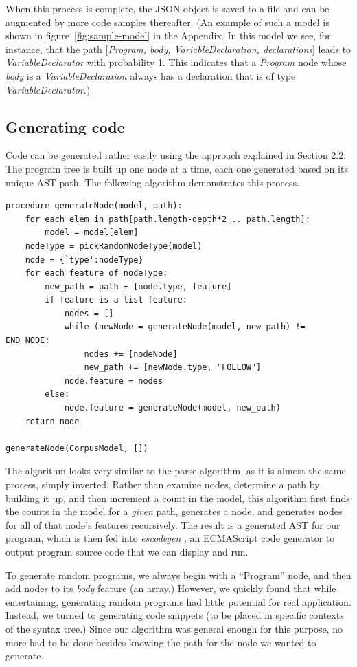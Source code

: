 \documentclass{article}
\begin{document}
When this process is complete, the JSON object is saved to a file and can be augmented by more code samples thereafter. (An example of such a model is shown in figure~\ref{fig:sample-model} in the Appendix. In this model we see, for instance, that the path
[\emph{Program, body, VariableDeclaration, declarations}] leads to
\emph{VariableDeclarator} with probability 1. This indicates that a \emph{Program}
node whose \emph{body} is a \emph{VariableDeclaration} always has a declaration that is of
type \emph{VariableDeclarator}.)

\subsection{Generating code}

Code can be generated rather easily using the approach explained in Section 2.2. The program tree is built up one node at a time, each one generated based on its unique AST path. The following algorithm demonstrates this process.

\begin{verbatim}
procedure generateNode(model, path):
    for each elem in path[path.length-depth*2 .. path.length]:
        model = model[elem]
    nodeType = pickRandomNodeType(model)
    node = {`type':nodeType}
    for each feature of nodeType:
        new_path = path + [node.type, feature]
        if feature is a list feature:
            nodes = []
            while (newNode = generateNode(model, new_path) != END_NODE:
                nodes += [nodeNode]
                new_path += [newNode.type, "FOLLOW"]
            node.feature = nodes
        else:
            node.feature = generateNode(model, new_path)
    return node

generateNode(CorpusModel, [])
\end{verbatim}

The algorithm looks very similar to the parse algorithm, as it is almost the same process, simply inverted. Rather than examine nodes, determine a path by building it up, and then increment a count in the model, this algorithm first finds the counts in the model for a \emph{given} path, generates a node, and generates nodes for all of that node's features recursively. The result is a generated AST for our program, which is then fed into \emph{escodegen} \cite{escodegen}, an ECMAScript code generator to output program source code that we can display and run.

To generate random programs, we always begin with a ``Program'' node, and then add nodes to its \emph{body} feature (an array.) However, we quickly found that while entertaining, generating random programs had little potential for real application. Instead, we turned to generating code snippets (to be placed in specific contexts of the syntax tree.) Since our algorithm was general enough for this purpose, no more had to be done besides knowing the path for the node we wanted to generate.
\end{document}

